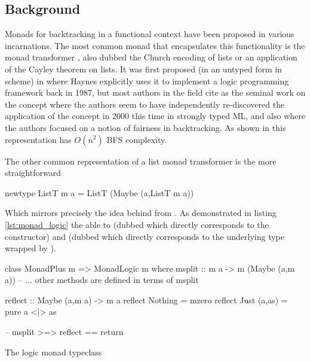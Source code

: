 \subsection{Background}

Monads for backtracking in a functional context have been proposed in
various incarnations.  The most common monad that encapsulates this functionality is the  monad transformer
, also
dubbed the Church encoding of lists or an application of the Cayley
theorem on lists. It was first proposed (in an untyped form in
scheme) in \cite{haynesLogicContinuations1987} where Haynes explicitly
uses it to implement a logic programming framework back in 1987, but
most authors in the field cite
\cite{hinzeDerivingBacktrackingMonad2000a} as the seminal work on the
concept where the authors seem to have independently re-discovered the
application of the concept in 2000 this time in strongly typed ML, and also
\cite{kiselyovBacktrackingInterleavingTerminating} where the authors
focused on a notion of fairness in backtracking. As shown in
\cite{kidneyAlgebrasWeightedSearch2021} this representation has
\(O(n^2)\) BFS complexity.

The other common representation of a list monad transformer is the more
straightforward

\begin{haskellcode}
newtype ListT m a = ListT (Maybe (a,ListT m a))
\end{haskellcode}

Which mirrors precisely the idea behind  from
\cite{kiselyovBacktrackingInterleavingTerminating}. As demonstrated in
listing \ref{lst:monad_logic} the  able to
 (dubbed  which directly corresponds to the  constructor) and  (dubbed
 which directly corresponds to the underlying type wrapped by ).

\begin{code}
\begin{haskellcode}
class MonadPlus m => MonadLogic m where
  msplit :: m a -> m (Maybe (a,m a))
  -- ... other methods are defined in terms of msplit

reflect :: Maybe (a,m a) -> m a
reflect Nothing = mzero
reflect Just (a,as) = pure a <|> as

-- msplit >=> reflect == return
\end{haskellcode}
  \caption{\label{lst:monad_logic}The logic monad typeclass}
\end{code}

